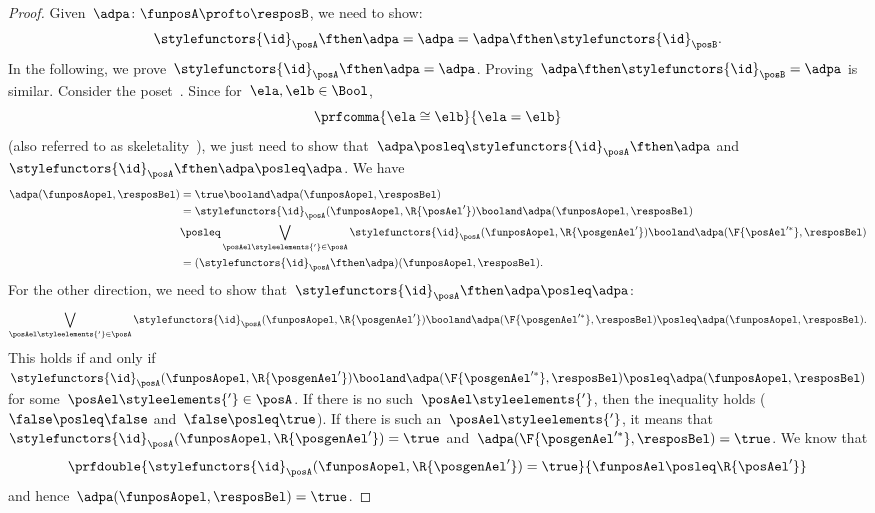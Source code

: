 \begin{proof}
	Given~$\adpa\colon \funposA\profto \resposB$, we need to show:
	\begin{equation*}
		\stylefunctors{\id}_\posA \fthen \adpa = \adpa = \adpa \fthen \stylefunctors{\id}_\posB.
	\end{equation*}
	In the following, we prove~$\stylefunctors{\id}_\posA \fthen \adpa = \adpa$.
	Proving~$\adpa\fthen \stylefunctors{\id}_\posB=\adpa$ is similar.
	Consider the poset~\Bool.
	Since for~$\ela,\elb\in \Bool$,
	\begin{equation*}
		\prfcomma{
			\ela\cong \elb
		}{
			\ela=\elb
		}
	\end{equation*}
	(also referred to as skeletality~\cite{fong2019}), we just need to show that~$\adpa\posleq \stylefunctors{\id}_\posA\fthen \adpa$ and~$\stylefunctors{\id}_\posA\fthen \adpa\posleq \adpa$.
	We have
	\begin{equation*}
		\label{eq:dp_unit_1}
		\begin{aligned}
			\adpa(\funposAopel,\resposBel) & =\true \booland \adpa(\funposAopel,\resposBel)                                                                                                       \\
			                               & = \stylefunctors{\id}_\posA(\funposAopel,\R{\posAel'}) \booland \adpa(\funposAopel,\resposBel)                                                       \\
			                               & \posleq \bigvee_{\posAel\styleelements{'} \in \posA}\stylefunctors{\id}_\posA(\funposAopel,\R{\posgenAel'})\booland \adpa(\F{\posAel'^*},\resposBel) \\
			                               & =(\stylefunctors{\id}_\posA\fthen \adpa)(\funposAopel,\resposBel).
		\end{aligned}
	\end{equation*}
	For the other direction, we need to show that~$\stylefunctors{\id}_\posA\fthen \adpa\posleq \adpa$:
	\begin{equation*}
		\label{eq:dp_unit_2}
		\bigvee_{\posAel\styleelements{'}\in \posA}\stylefunctors{\id}_\posA(\funposAopel,\R{\posgenAel'})\booland \adpa(\F{\posgenAel'^*},\resposBel) \posleq \adpa(\funposAopel,\resposBel).
	\end{equation*}
	This holds if and only if~$\stylefunctors{\id}_\posA(\funposAopel,\R{\posgenAel'})\booland \adpa(\F{\posgenAel'^*},\resposBel) \posleq \adpa(\funposAopel,\resposBel)$ for some~$\posAel\styleelements{'}\in \posA$.
	If there is no such~$\posAel\styleelements{'}$, then the inequality holds ($\false \posleq \false$ and~$\false \posleq \true$).
	If there is such an~$\posAel\styleelements{'}$, it means that~$\stylefunctors{\id}_\posA(\funposAopel,\R{\posgenAel'})=\true$ and~$\adpa(\F{\posgenAel'^*},\resposBel)=\true$.
	We know that
	\begin{equation*}
		\prfdouble{\stylefunctors{\id}_\posA(\funposAopel,\R{\posgenAel'})=\true}{\funposAel \posleq \R{\posAel'}}
	\end{equation*}
	and hence~$\adpa(\funposAopel,\resposBel)=\true$.
\end{proof}
